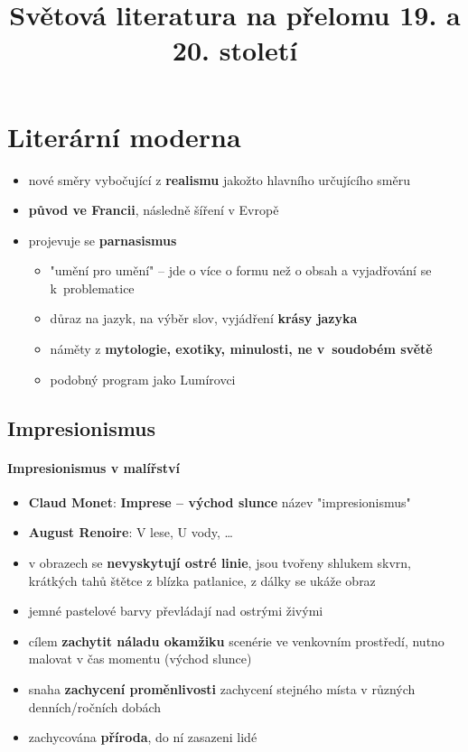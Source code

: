 \title{Světová literatura na přelomu 19. a 20. století}


\section{Literární moderna}
\begin{itemize}
\item nové směry vybočující z \textbf{realismu} jakožto hlavního určujícího směru
\item \textbf{původ ve Francii}, následně šíření v Evropě
\item projevuje se \textbf{parnasismus} 
\begin{itemize}
	\item "umění pro umění" -- jde o více o formu než o obsah a vyjadřování se k~problematice
	\item důraz na jazyk, na výběr slov, vyjádření \textbf{krásy jazyka}
	\item náměty z \textbf{mytologie, exotiky, minulosti, ne v~soudobém světě}
	\item podobný program jako Lumírovci
\end{itemize}

\end{itemize}

\subsection{Impresionismus}
\paragraph{Impresionismus v malířství}
\begin{itemize}
\item \textbf{Claud Monet}: \textbf{Imprese -- východ slunce} \ra název "impresionismus"
\item \textbf{August Renoire}: V lese, U vody, \ldots
\item v obrazech se \textbf{nevyskytují ostré linie}, jsou tvořeny shlukem skvrn, krátkých tahů štětce \ra z blízka patlanice, z dálky se ukáže obraz
\item jemné pastelové barvy převládají nad ostrými živými
\item cílem \textbf{zachytit náladu okamžiku} \ra scenérie ve venkovním prostředí, nutno malovat v čas momentu (východ slunce)
\item snaha \textbf{zachycení proměnlivosti} \ra zachycení stejného místa v různých denních/ročních dobách
\item zachycována \textbf{příroda}, do ní zasazeni lidé
\end{itemize}

